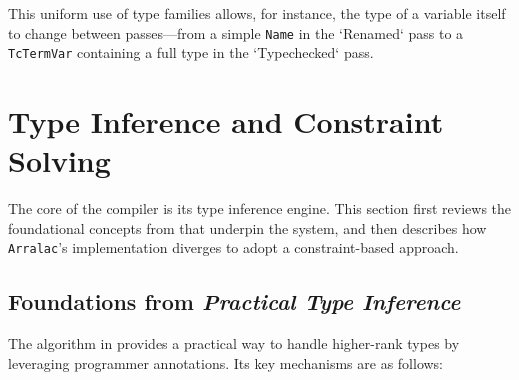 This uniform use of type families allows, for instance, the type of a variable itself to change between passes—from a simple \texttt{Name} in the `Renamed` pass to a \texttt{TcTermVar} containing a full type in the `Typechecked` pass.

\section{Type Inference and Constraint Solving}
\label{sec:Design:TypeInference}

The core of the compiler is its type inference engine. This section first reviews the foundational concepts from \cite{jones-practical-2007} that underpin the system, and then describes how \texttt{Arralac}'s implementation diverges to adopt a constraint-based approach.

\subsection{Foundations from \textit{Practical Type Inference}}
\label{sec:Design:Foundations}

The algorithm in \cite{jones-practical-2007} provides a practical way to handle higher-rank types by leveraging programmer annotations. Its key mechanisms are as follows:

